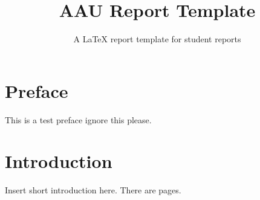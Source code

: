 \documentclass{aau-report}
\title{AAU Report Template}
\subtitle{A \LaTeX{} report template for student reports}
\begin{document}
\frontmatter
\maketitle
\tableofcontents
\chapter{Preface}
This is a test preface ignore this please.

\mainmatter
\chapter{Introduction}
Insert short introduction here. There are \pageref{LastPage} pages.
\end{document}
